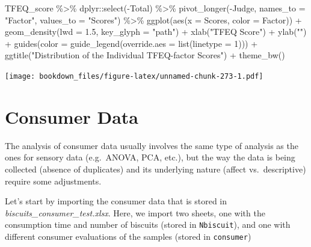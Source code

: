 \documentclass[
]{krantz}
\makeatletter
\newenvironment{Shaded}{\begin{snugshade}}{\end{snugshade}}
\newcommand{\AttributeTok}[1]{\textcolor[rgb]{0.61,0.61,0.61}{#1}}
\newcommand{\DecValTok}[1]{\textcolor[rgb]{0.06,0.06,0.06}{#1}}
\newcommand{\FloatTok}[1]{\textcolor[rgb]{0.06,0.06,0.06}{#1}}
\newcommand{\FunctionTok}[1]{\textcolor[rgb]{0,0,0}{#1}}
\newcommand{\NormalTok}[1]{#1}
\newcommand{\SpecialCharTok}[1]{\textcolor[rgb]{0,0,0}{#1}}
\newcommand{\StringTok}[1]{\textcolor[rgb]{0.5,0.5,0.5}{#1}}
\newenvironment{kframe}{%
\medskip{}
\setlength{\fboxsep}{.8em}
 \def\at@end@of@kframe{}%
 \ifinner\ifhmode%
  \def\at@end@of@kframe{\end{minipage}}%
  \begin{minipage}{\columnwidth}%
 \fi\fi%
 \def\FrameCommand##1{\hskip\@totalleftmargin \hskip-\fboxsep
 \colorbox{shadecolor}{##1}\hskip-\fboxsep
     \hskip-\linewidth \hskip-\@totalleftmargin \hskip\columnwidth}%
 \MakeFramed {\advance\hsize-\width
   \@totalleftmargin\z@ \linewidth\hsize
   \@setminipage}}%
 {\par\unskip\endMakeFramed%
 \at@end@of@kframe}
\renewenvironment{Shaded}{\begin{kframe}}{\end{kframe}}
\makeatother
\begin{document}
\begin{Shaded}
\begin{Highlighting}[]
\NormalTok{TFEQ\_score }\SpecialCharTok{\%\textgreater{}\%}
\NormalTok{  dplyr}\SpecialCharTok{::}\FunctionTok{select}\NormalTok{(}\SpecialCharTok{{-}}\NormalTok{Total) }\SpecialCharTok{\%\textgreater{}\%}
  \FunctionTok{pivot\_longer}\NormalTok{(}\SpecialCharTok{{-}}\NormalTok{Judge, }\AttributeTok{names\_to =} \StringTok{"Factor"}\NormalTok{, }\AttributeTok{values\_to =} \StringTok{"Scores"}\NormalTok{) }\SpecialCharTok{\%\textgreater{}\%}
  \FunctionTok{ggplot}\NormalTok{(}\FunctionTok{aes}\NormalTok{(}\AttributeTok{x =}\NormalTok{ Scores, }\AttributeTok{color =}\NormalTok{ Factor)) }\SpecialCharTok{+}
  \FunctionTok{geom\_density}\NormalTok{(}\AttributeTok{lwd =} \FloatTok{1.5}\NormalTok{, }\AttributeTok{key\_glyph =} \StringTok{"path"}\NormalTok{) }\SpecialCharTok{+}
  \FunctionTok{xlab}\NormalTok{(}\StringTok{"TFEQ Score"}\NormalTok{) }\SpecialCharTok{+}
  \FunctionTok{ylab}\NormalTok{(}\StringTok{""}\NormalTok{) }\SpecialCharTok{+}
  \FunctionTok{guides}\NormalTok{(}\AttributeTok{color =} \FunctionTok{guide\_legend}\NormalTok{(}\AttributeTok{override.aes =} \FunctionTok{list}\NormalTok{(}\AttributeTok{linetype =} \DecValTok{1}\NormalTok{))) }\SpecialCharTok{+}
  \FunctionTok{ggtitle}\NormalTok{(}\StringTok{"Distribution of the Individual TFEQ{-}factor Scores"}\NormalTok{) }\SpecialCharTok{+}
  \FunctionTok{theme\_bw}\NormalTok{()}
\end{Highlighting}
\end{Shaded}

\texttt{[image: bookdown\_files/figure-latex/unnamed-chunk-273-1.pdf]}

\hypertarget{tibble-use}{%
\section{Consumer Data}\label{tibble-use}}

The analysis of consumer data usually involves the same type of analysis as the ones for sensory data (e.g.~ANOVA, PCA, etc.), but the way the data is being collected (absence of duplicates) and its underlying nature (affect vs.~descriptive) require some adjustments.

Let's start by importing the consumer data that is stored in \emph{biscuits\_consumer\_test.xlsx}. Here, we import two sheets, one with the consumption time and number of biscuits (stored in \texttt{Nbiscuit}), and one with different consumer evaluations of the samples (stored in \texttt{consumer})
\end{document}
